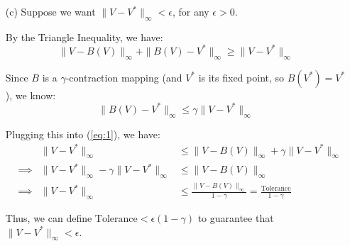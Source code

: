 \begin{solution}
\begin{itemize}
              Which contradicts the fact that $\gamma < 1$.

              Thus, $B$ has exactly one fixed point if we assume $B$ has at least one fixed point.
              I have proved in the simplified setting where we consider $f: \mathbb{R} \to \mathbb{R}$ be differentiable
              and $f'(x) < L$, $L < 1$ that $f$ has at least one fixed point and, in fact, exactly one.
              (Real Analysis note, problem 8)
              \begin{remark}{Convergence of Value Iteration Algorithm}
                  Let $V^*$ be the fixed point of $B$, meaning $B(V^*) = V^*$.
                  We have
                  $$
                      ||B^t(V) - V^*||_\infty \le \gamma^t ||V - V^*||_\infty, \quad \forall t \in \mathbb{N}
                  $$
                  This means that value iteration converges geometrically to the optimal
                  value function $V^*$. That is, after $t$ iterations, the distance between $V$
                  and $V^*$ is at most $\gamma^t ||V - V^*||_\infty$.
              \end{remark}
        \item[(c)]
              Suppose we want $\|V - V^*\|_\infty < \epsilon$, for any $\epsilon > 0$.

              By the Triangle Inequality, we have:
              \begin{equation}
                  \|V - B(V)\|_\infty + \|B(V) - V^*\|_\infty \geq \|V - V^*\|_\infty \label{eq:1}
              \end{equation}

              Since $B$ is a $\gamma$-contraction mapping (and $V^*$ is its fixed point, so $B(V^*) = V^*$), we know:
              $$ \|B(V) - V^*\|_\infty \leq \gamma \|V - V^*\|_\infty $$

              Plugging this into (\ref{eq:1}), we have:
              \begin{align*}
                   &          & \|V - V^*\|_\infty                             & \leq \|V - B(V)\|_\infty + \gamma \|V - V^*\|_\infty                              \\
                   & \implies & \|V - V^*\|_\infty - \gamma \|V - V^*\|_\infty & \leq \|V - B(V)\|_\infty                                                          \\
                   & \implies & \|V - V^*\|_\infty                             & \leq \frac{\|V - B(V)\|_\infty}{1 - \gamma} = \frac{\text{Tolerance}}{1 - \gamma}
              \end{align*}

              Thus, we can define $\text{Tolerance} < \epsilon(1 - \gamma)$ to guarantee that $\|V - V^*\|_\infty < \epsilon$.
    \end{itemize}

\end{solution}